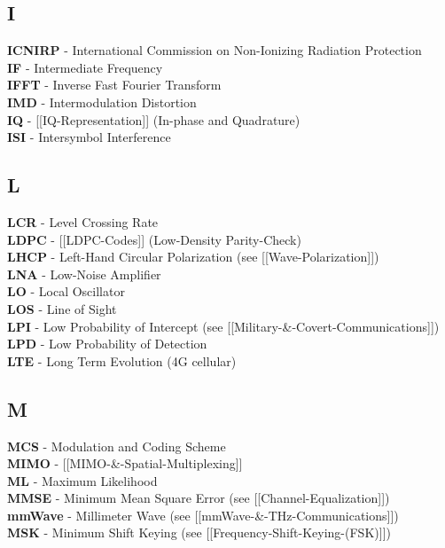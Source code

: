 \subsection{I}\label{i}

\textbf{ICNIRP} - International Commission on Non-Ionizing Radiation
Protection\\
\textbf{IF} - Intermediate Frequency\\
\textbf{IFFT} - Inverse Fast Fourier Transform\\
\textbf{IMD} - Intermodulation Distortion\\
\textbf{IQ} - {[}{[}IQ-Representation{]}{]} (In-phase and Quadrature)\\
\textbf{ISI} - Intersymbol Interference

\subsection{L}\label{l}

\textbf{LCR} - Level Crossing Rate\\
\textbf{LDPC} - {[}{[}LDPC-Codes{]}{]} (Low-Density Parity-Check)\\
\textbf{LHCP} - Left-Hand Circular Polarization (see
{[}{[}Wave-Polarization{]}{]})\\
\textbf{LNA} - Low-Noise Amplifier\\
\textbf{LO} - Local Oscillator\\
\textbf{LOS} - Line of Sight\\
\textbf{LPI} - Low Probability of Intercept (see
{[}{[}Military-\&-Covert-Communications{]}{]})\\
\textbf{LPD} - Low Probability of Detection\\
\textbf{LTE} - Long Term Evolution (4G cellular)

\subsection{M}\label{m}

\textbf{MCS} - Modulation and Coding Scheme\\
\textbf{MIMO} - {[}{[}MIMO-\&-Spatial-Multiplexing{]}{]}\\
\textbf{ML} - Maximum Likelihood\\
\textbf{MMSE} - Minimum Mean Square Error (see
{[}{[}Channel-Equalization{]}{]})\\
\textbf{mmWave} - Millimeter Wave (see
{[}{[}mmWave-\&-THz-Communications{]}{]})\\
\textbf{MSK} - Minimum Shift Keying (see
{[}{[}Frequency-Shift-Keying-(FSK){]}{]})

